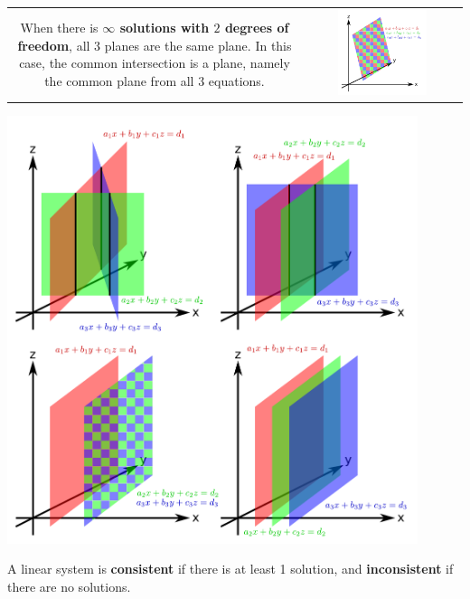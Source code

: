 \documentclass{article}
\begin{document}
\begin{tabular}{cc}
\parbox{0.4\textwidth}{
When there is {\bf \(\infty\) solutions with \(2\) degrees of freedom}, all \(3\) planes are the same plane. In this case, the common intersection is a plane, namely the common plane from all \(3\) equations. 
} & \parbox{0.6\textwidth}{
\includegraphics[width = 0.6\textwidth]{3_variable_system_inf2_solutions}
}
\end{tabular}

\includegraphics[width = 0.9\textwidth]{3_variable_system_0_solutions} 

A linear system is {\bf consistent} if there is at least 1 solution, and {\bf inconsistent} if there are no solutions. 
\end{document}

